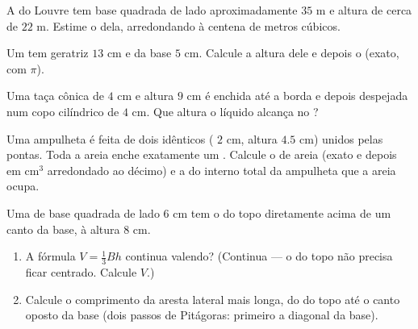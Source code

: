 \begin{exercise}[$\star\star$]\label{exo:g8:solids:7}
A  do Louvre tem base quadrada de lado aproximadamente $35$ m
e altura de cerca de $22$ m. Estime o  dela, arredondando à
centena de metros cúbicos.
\end{exercise}

\begin{exercise}[$\star\star$]\label{exo:g8:solids:8}
Um  tem geratriz $13$ cm e  da base $5$ cm. Calcule a altura
dele e depois o  (exato, com $\pi$).
\end{exercise}

\begin{exercise}[$\star\star$]\label{exo:g8:solids:9}
Uma taça cônica de  $4$ cm e altura $9$ cm é enchida até a borda e
depois despejada num copo cilíndrico de  $4$ cm. Que altura o
líquido alcança no ?
\end{exercise}

\begin{exercise}[$\star\star$]\label{exo:g8:solids:10}
Uma ampulheta é feita de dois  idênticos ( $2$ cm, altura
$4.5$ cm) unidos pelas pontas. Toda a areia enche exatamente um .
Calcule o  de areia (exato e depois em cm$^3$ arredondado ao
décimo) e a  do  interno total da ampulheta que a areia
ocupa.
\end{exercise}

\begin{exercise}[$\star\star\star$]\label{exo:g8:solids:11}
Uma  de base quadrada de lado $6$ cm tem o  do topo
diretamente acima de um canto da base, à altura $8$ cm.
\begin{enumerate}
  \item A fórmula $V = \frac13 Bh$ continua valendo? (Continua --- o
         do topo não precisa ficar centrado. Calcule $V$.)
  \item Calcule o comprimento da aresta lateral mais longa, do 
        do topo até o canto oposto da base (dois passos de Pitágoras:
        primeiro a diagonal da base).
\end{enumerate}
\end{exercise}

